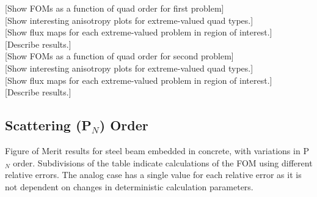 [Show FOMs as a function of quad order for first problem] \\

[Show interesting anisotropy plots for extreme-valued quad types.] \\

[Show flux maps for each extreme-valued problem in region of interest.] \\

[Describe results.] \\

[Show FOMs as a function of quad order for second problem] \\

[Show interesting anisotropy plots for extreme-valued quad types.] \\

[Show flux maps for each extreme-valued problem in region of interest.] \\

[Describe results.] \\

\subsection{Scattering (P$_N$) Order}
\label{subsec:pnorder}

\begin{table}[h!]
  \centering
  
  \caption[Figure of Merit results for steel beam embedded in concrete, with
  variations in P$_{N}$ order.]{Figure of Merit results for steel beam embedded in concrete, with
    variations in P$_{N}$ order. Subdivisions of the table indicate
calculations of the FOM using different relative errors. The analog case has a
single value for each relative error as it is not dependent on changes in
deterministic calculation parameters.}
  \label{tab:pn_foms}
\end{table}

